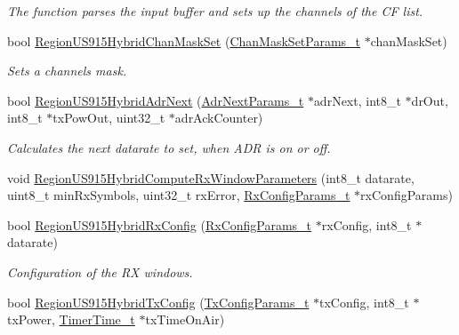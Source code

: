 \begin{DoxyCompactItemize}
\begin{DoxyCompactList}\small\item\em The function parses the input buffer and sets up the channels of the CF list. \end{DoxyCompactList}\item 
bool \mbox{\hyperlink{group___r_e_g_i_o_n_u_s915_h_y_b_gab7d8969e0b1037572a6703d7995c44e3}{Region\+U\+S915\+Hybrid\+Chan\+Mask\+Set}} (\mbox{\hyperlink{group___r_e_g_i_o_n_ga6d24f7da136006410827dfb29f6b9b9e}{Chan\+Mask\+Set\+Params\+\_\+t}} $\ast$chan\+Mask\+Set)
\begin{DoxyCompactList}\small\item\em Sets a channels mask. \end{DoxyCompactList}\item 
bool \mbox{\hyperlink{group___r_e_g_i_o_n_u_s915_h_y_b_ga6cf3188c00bf9a9eaa7c62686dd4b391}{Region\+U\+S915\+Hybrid\+Adr\+Next}} (\mbox{\hyperlink{group___r_e_g_i_o_n_ga567c2742622326b350b4e91bbf61b4ce}{Adr\+Next\+Params\+\_\+t}} $\ast$adr\+Next, int8\+\_\+t $\ast$dr\+Out, int8\+\_\+t $\ast$tx\+Pow\+Out, uint32\+\_\+t $\ast$adr\+Ack\+Counter)
\begin{DoxyCompactList}\small\item\em Calculates the next datarate to set, when A\+DR is on or off. \end{DoxyCompactList}\item 
void \mbox{\hyperlink{group___r_e_g_i_o_n_u_s915_h_y_b_gaf5cfd5576e5648a2a0bb12a982beb973}{Region\+U\+S915\+Hybrid\+Compute\+Rx\+Window\+Parameters}} (int8\+\_\+t datarate, uint8\+\_\+t min\+Rx\+Symbols, uint32\+\_\+t rx\+Error, \mbox{\hyperlink{group___r_e_g_i_o_n_ga375c038078dfcfc7ef14280021db719e}{Rx\+Config\+Params\+\_\+t}} $\ast$rx\+Config\+Params)
\item 
bool \mbox{\hyperlink{group___r_e_g_i_o_n_u_s915_h_y_b_ga0f982743b1649a9491067676307a2e75}{Region\+U\+S915\+Hybrid\+Rx\+Config}} (\mbox{\hyperlink{group___r_e_g_i_o_n_ga375c038078dfcfc7ef14280021db719e}{Rx\+Config\+Params\+\_\+t}} $\ast$rx\+Config, int8\+\_\+t $\ast$datarate)
\begin{DoxyCompactList}\small\item\em Configuration of the RX windows. \end{DoxyCompactList}\item 
bool \mbox{\hyperlink{group___r_e_g_i_o_n_u_s915_h_y_b_gaad87151c4921c1caae24b3b8bb4135b9}{Region\+U\+S915\+Hybrid\+Tx\+Config}} (\mbox{\hyperlink{group___r_e_g_i_o_n_gabed730d4d04b0b60d4b6d1966d3f21d3}{Tx\+Config\+Params\+\_\+t}} $\ast$tx\+Config, int8\+\_\+t $\ast$tx\+Power, \mbox{\hyperlink{utilities_8h_a4215ca43d3e953099ea758ce428599d0}{Timer\+Time\+\_\+t}} $\ast$tx\+Time\+On\+Air)

\end{DoxyCompactItemize}
